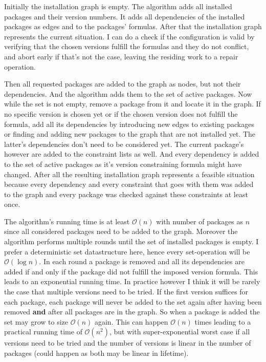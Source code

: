 \documentclass[a4paper]{scrartcl}
\begin{document}
	Initially the installation graph is empty. The algorithm adds all installed packages and their version numbers. It adds all dependencies of the installed packages as edges and to the packages' formulas. After that the installation graph represents the current situation. I can do a check if the configuration is valid by verifying that the chosen versions fulfill the formulas and they do not conflict, and abort early if that's not the case, leaving the residing work to a repair operation.
	
	Then all requested packages are added to the graph as nodes, but not their dependencies. And the algorithm adds them to the set of active packages. Now while the set is not empty, remove a package from it and locate it in the graph. If no specific version is chosen yet or if the chosen version does not fulfill the formula, add all its dependencies by introducing new edges to existing packages or finding and adding new packages to the graph that are not installed yet. The latter's dependencies don't need to be considered yet. The current package's however are added to the constraint lists as well. And every dependency is added to the set of active packages as it's version constraining formula might have changed. After all the resulting installation graph represents a feasible situation because every dependency and every constraint that goes with them was added to the graph and every package was checked against these constraints at least once.
	
	The algorithm's running time is at least $\mathcal{O}(n)$ with number of packages as $n$ since all considered packages need to be added to the graph. Moreover the algorithm performs multiple rounds until the set of installed packages is empty. I prefer a deterministic set datastructure here, hence every set-operation will be $\mathcal{O}(\log{}n)$. In each round a package is removed and all its dependencies are added if and only if the package did not fulfill the imposed version formula. This leads to an exponential running time. In practice however I think it will be rarely the case that multiple versions need to be tried. If the first version suffices for each package, each package will never be added to the set again after having been removed \textbf{and} after all packages are in the graph. So when a package is added the set may grow to size $\mathcal{O}(n)$ again. This can happen $\mathcal{O}(n)$ times leading to a practical running time of $\mathcal{O}(n^2)$, but with super-exponential worst case if all versions need to be tried and the number of versions is linear in the number of packages (could happen as both may be linear in lifetime).
	
\end{document}
